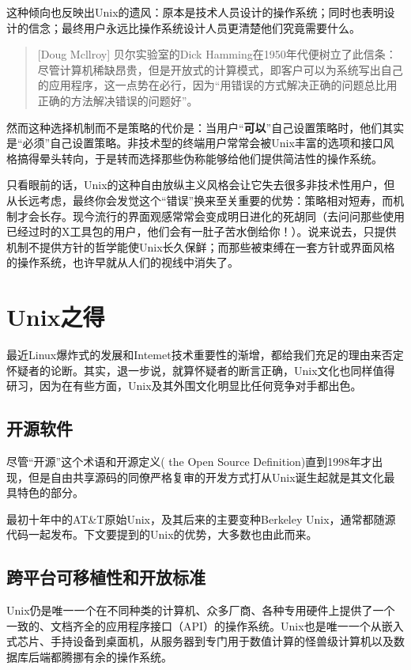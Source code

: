 \documentclass[11pt,oneside]{book}
\begin{document}
\begin{common-format}
这种倾向也反映出Unix的遗风：原本是技术人员设计的操作系统；同时也表明设计的信念；最终用户永远比操作系统设计人员更清楚他们究竟需要什么。

\begin{quote}[Doug Mcllroy]
贝尔实验室的Dick Hamming在1950年代便树立了此信条：尽管计算机稀缺昂贵，但是开放式的计算模式，即客户可以为系统写出自己的应用程序，这一点势在必行，因为“用错误的方式解决正确的问题总比用正确的方法解决错误的问题好”。
\end{quote}

然而这种选择机制而不是策略的代价是：当用户“\textbf{可以}”自己设置策略时，他们其实是“必须”自己设置策略。非技术型的终端用户常常会被Unix丰富的选项和接口风格搞得晕头转向，于是转而选择那些伪称能够给他们提供简洁性的操作系统。

只看眼前的话，Unix的这种自由放纵主义风格会让它失去很多非技术性用户，但从长远考虑，最终你会发觉这个“错误”换来至关重要的优势：策略相对短寿，而机制才会长存。现今流行的界面观感常常会变成明日进化的死胡同（去问问那些使用已经过时的X工具包的用户，他们会有一肚子苦水倒给你！）。说来说去，只提供机制不提供方针的哲学能使Unix长久保鲜；而那些被束缚在一套方针或界面风格的操作系统，也许早就从人们的视线中消失了。


\section{Unix之得}
最近Linux爆炸式的发展和Intemet技术重要性的渐增，都给我们充足的理由来否定怀疑者的论断。其实，退一步说，就算怀疑者的断言正确，Unix文化也同样值得研习，因为在有些方面，Unix及其外围文化明显比任何竞争对手都出色。

\subsection{开源软件}
尽管“开源”这个术语和开源定义( the Open Source Definition)直到1998年才出现，但是自由共享源码的同僚严格复审的开发方式打从Unix诞生起就是其文化最具特色的部分。

最初十年中的AT\&{}T原始Unix，及其后来的主要变种Berkeley Unix，通常都随源代码一起发布。下文要提到的Unix的优势，大多数也由此而来。

\subsection{跨平台可移植性和开放标准}
Unix仍是唯一一个在不同种类的计算机、众多厂商、各种专用硬件上提供了一个一致的、文档齐全的应用程序接口（API）的操作系统。Unix也是唯一一个从嵌入式芯片、手持设备到桌面机，从服务器到专门用于数值计算的怪兽级计算机以及数据库后端都腾挪有余的操作系统。


\end{common-format}
\end{document}
